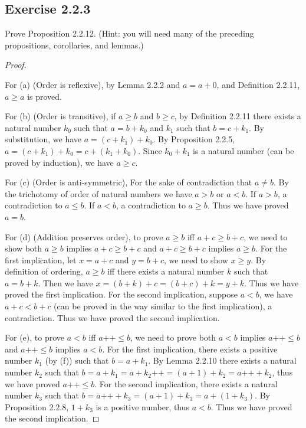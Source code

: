 \documentclass[a4paper]{article}
\begin{document}
\subsection*{Exercise 2.2.3}

Prove Proposition 2.2.12. (Hint: you will need many of the
preceding propositions, corollaries, and lemmas.)

\begin{proof}

$ $\newline

For (a) (Order is reflexive), by Lemma 2.2.2 and $a = a + 0$, and Definition 2.2.11, $a \ge a$ is proved.

For (b) (Order is transitive), if $a \ge b$ and $b \ge c$, by Definition 2.2.11 there exists a natural number $k_0$ such that $a = b + k_0$ and $k_1$ such that $b = c + k_1$. By substitution, we have $a = \left( c + k_1 \right) + k_0$. By Proposition 2.2.5, $a = \left( c + k_1 \right) + k_0 = c + \left( k_1 + k_0 \right) $. Since $k_0 + k_1$ is a natural number (can be proved by induction), we have $a \ge c$.

For (c) (Order is anti-symmetric), For the sake of contradiction that $a \neq b$. By the trichotomy of order of natural numbers we have $a > b$ or $a < b$. If $a > b$, a contradiction to $a \le b$. If $a < b$, a contradiction to  $a \ge b$. Thus we have proved $a = b$.

For (d) (Addition preserves order), to prove $a \ge b$ iff $a + c \ge b + c$, we need to show both $a \ge b$ implies $a + c \ge b + c$ and $a + c \ge b + c$ implies $a \ge b$. For the first implication, let $x = a + c$ and $y = b + c$, we need to show $x \ge y$. By definition of ordering, $a \ge b$ iff there exists a natural number $k$ such that $a = b + k$. Then we have $x = \left( b + k \right) + c = \left( b + c \right) + k = y + k$. Thus we have proved the first implication. For the second implication, suppose $a < b$, we have $a + c < b + c$ (can be proved in the way similar to the first implication), a contradiction. Thus we have proved the second implication.

For (e), to prove $a < b$ iff $a\text{++} \le b$, we need to prove both $a < b$ implies $a\text{++} \le b$ and $a\text{++} \le b$ implies $a < b$. For the first implication, there exists a positive number $k_1$ (by (f)) such that $b = a + k_1$. By Lemma 2.2.10 there exists a natural number $k_2$ such that $b = a + k_1 = a + k_2\text{++} = \left( a + 1 \right) + k_2 = a\text{++} + k_2$, thus we have proved $a\text{++} \le b$. For the second implication, there exists a natural number $k_3$ such that $b = a\text{++} + k_3 = (a + 1) + k_3 = a + (1 + k_3)$. By Proposition 2.2.8, $1 + k_3$ is a positive number, thus $a < b$. Thus we have proved the second implication.


\end{proof}
\end{document}
